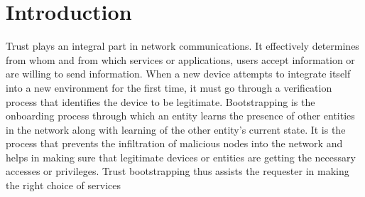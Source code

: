 \section{Introduction}

Trust plays an integral part in network communications.
It effectively determines from whom and from which services or applications, users accept information or are willing to send information.
When a new device attempts to integrate itself into a new environment for the first time, it must go through a verification process that identifies the device to be legitimate.
Bootstrapping is the onboarding process through which an entity learns the presence of other entities in the network along with learning of the other entity’s current state.
It is the process that prevents the infiltration of malicious nodes into the network and helps in making sure that legitimate devices or entities are getting the necessary accesses or privileges.
Trust bootstrapping thus assists the requester in making the right choice of services 
